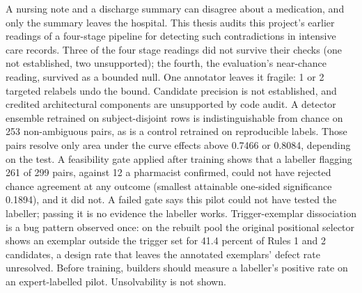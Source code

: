 A nursing note and a discharge summary can disagree about a medication, and only the summary leaves
the hospital. This thesis audits this project's earlier readings of a four-stage pipeline for
detecting such contradictions in intensive care records. Three of the four stage readings did not
survive their checks (one not established, two unsupported); the fourth, the evaluation's near-chance
reading, survived as a bounded null. One annotator leaves it fragile: 1 or 2 targeted relabels undo the bound. Candidate precision is not
established, and credited architectural components are unsupported by code audit. A detector ensemble
retrained on subject-disjoint rows is indistinguishable from chance on 253 non-ambiguous pairs, as is a
control retrained on reproducible labels. Those pairs resolve only area under the curve
effects above 0.7466 or 0.8084, depending on the test. A feasibility gate applied after training shows
that a labeller flagging 261 of 299 pairs, against 12 a pharmacist confirmed, could not have rejected
chance agreement at any outcome (smallest attainable one-sided significance 0.1894), and it did not. A
failed gate says this pilot could not have tested the labeller; passing it is no evidence the labeller
works. Trigger-exemplar dissociation is a bug pattern observed once: on the rebuilt pool the original
positional selector shows an exemplar outside the trigger set for 41.4 percent of Rules 1 and 2
candidates, a design rate that leaves the annotated exemplars' defect rate unresolved. Before
training, builders should measure a labeller's positive rate on an expert-labelled pilot.
Unsolvability is not shown.
